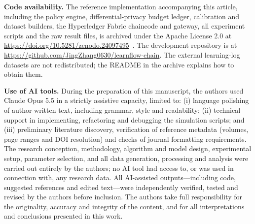 \documentclass[pdflatex,iicol,sn-mathphys-num]{sn-jnl}
\theoremstyle{thmstyleone}
\begin{document}
\textbf{Code availability.} The reference implementation accompanying this article, including the policy engine, differential-privacy budget ledger, calibration and dataset builders, the Hyperledger Fabric chaincode and gateway, all experiment scripts and the raw result files, is archived under the Apache License 2.0 at \url{https://doi.org/10.5281/zenodo.24097495}~\cite{zhang2026learnflowchain}. The development repository is at \url{https://github.com/JingZhang0630/learnflow-chain}. The external learning-log datasets are not redistributed; the README in the archive explains how to obtain them.

\textbf{Use of AI tools.} During the preparation of this manuscript, the authors used
Claude Opus 5.5 in a strictly assistive capacity, limited to:
(i) language polishing of author-written text, including grammar, style and readability;
(ii) technical support in implementing, refactoring and debugging the simulation scripts;
and (iii) preliminary literature discovery, verification of reference metadata (volumes, page ranges and DOI resolution) and checks of journal formatting requirements. The research conception, methodology, algorithm
and model design, experimental setup, parameter selection, and all data generation, processing
and analysis were carried out entirely by the authors; no AI tool had access to, or was used
in connection with, any research data. All AI-assisted outputs---including code, suggested
references and edited text---were independently verified, tested and revised by the authors
before inclusion. The authors take full responsibility for the originality, accuracy and
integrity of the content, and for all interpretations and conclusions presented in this work.


\end{document}
